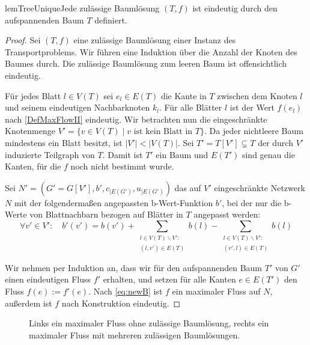\vspace{-1.9ex}
\begin{restatable}{lem}{TreeUnique}\label{TreeUnique}Jede zulässige Baumlösung $(T,f)$ ist eindeutig durch den aufspannenden Baum $T$ definiert.\end{restatable}
\begin{proof}Sei $(T,f)$ eine zulässige Baumlösung einer Instanz des Transportproblems. Wir führen eine Induktion über die Anzahl der Knoten des Baumes durch. Die zulässige Baumlösung zum leeren Baum ist offensichtlich eindeutig.

Für jedes Blatt $l\in V(T)$ sei $e_l\in E(T)$ die Kante in $T$ zwischen dem Knoten $l$ und seinem eindeutigen Nachbarknoten $k_l$. Für alle Blätter $l$ ist der Wert $f(e_l)$ nach \cref{DefMaxFlowII} eindeutig. Wir betrachten nun die eingeschränkte Knotenmenge $V'=\{v\in V(T)\mid v\text{ ist kein Blatt in }T\}$. Da jeder nichtleere Baum mindestens ein Blatt besitzt, ist $|V'|<|V(T)|$. Sei $T'=T[V']\subsetneq T$ der durch $V'$ induzierte Teilgraph von $T$. Damit ist $T'$ ein Baum und $E(T')$ sind genau die Kanten, für die $f$ noch nicht bestimmt wurde.

Sei $N'=(G'=G[V'],b',c_{|E(G')},u_{|E(G')})$ das auf $V'$ eingeschränkte Netzwerk $N$ mit der folgendermaßen angepassten b-Wert-Funktion $b'$, bei der nur die b-Werte von Blattnachbarn bezogen auf Blätter in $T$ angepasst werden:
\begin{equation}\label{eq:newB}
\forall v'\in V'\colon\quad b'(v')=b(v')+\sum_{\substack{l\in V(T)\backslash V':\\(l,v')\in E(T)}} b(l)-\sum_{\substack{l\in V(T)\backslash V':\\(v',l)\in E(T)}} b(l)\end{equation}

Wir nehmen per Induktion an, dass wir für den aufspannenden Baum $T'$ von $G'$ einen eindeutigen Fluss $f'$ erhalten, und setzen für alle Kanten $e\in E(T')$ den Fluss $f(e):=f'(e)$. Nach \cref{eq:newB} ist $f$ ein maximaler Fluss auf $N$, außerdem ist $f$ nach Konstruktion eindeutig.\end{proof}

\begin{figure}[!ht]\centering
    
    \caption{Links ein maximaler Fluss ohne zulässige Baumlösung, rechts ein maximaler Fluss mit mehreren zulässigen Baumlösungen.}
    \label{fig:BL}
\end{figure}


